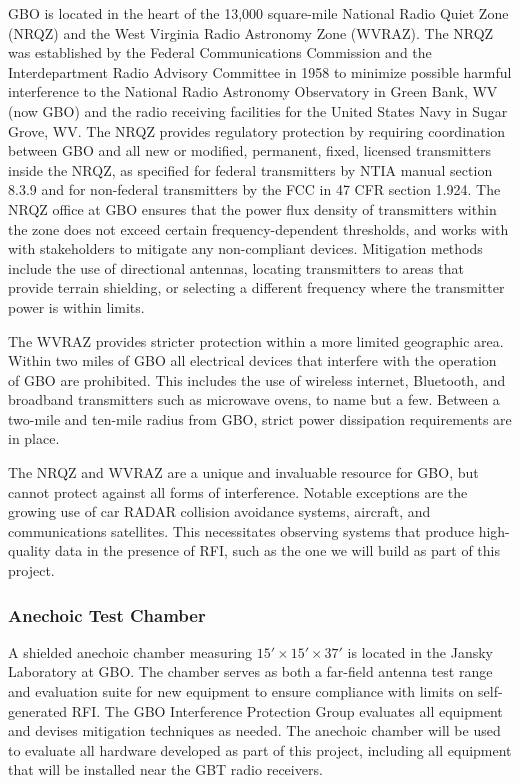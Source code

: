 \documentclass[10pt]{NSF}
\begin{document}
GBO is located in the heart of the 13,000 square-mile National Radio
Quiet Zone (NRQZ) and the West Virginia Radio Astronomy Zone (WVRAZ).
The NRQZ was established by the Federal Communications Commission and
the Interdepartment Radio Advisory Committee in 1958 to minimize
possible harmful interference to the National Radio Astronomy
Observatory in Green Bank, WV (now GBO) and the radio receiving
facilities for the United States Navy in Sugar Grove, WV.  The NRQZ
provides regulatory protection by requiring coordination between GBO
and all new or modified, permanent, fixed, licensed transmitters
inside the NRQZ, as specified for federal transmitters by NTIA manual
section 8.3.9 and for non-federal transmitters by the FCC in 47 CFR
section 1.924.  The NRQZ office at GBO ensures that the power flux
density of transmitters within the zone does not exceed certain
frequency-dependent thresholds, and works with with stakeholders to
mitigate any non-compliant devices.  Mitigation methods include the
use of directional antennas, locating transmitters to areas that
provide terrain shielding, or selecting a different frequency where
the transmitter power is within limits.

The WVRAZ provides stricter protection within a more limited
geographic area.  Within two miles of GBO all electrical devices that
interfere with the operation of GBO are prohibited.  This includes the
use of wireless internet, Bluetooth, and broadband transmitters such
as microwave ovens, to name but a few.  Between a two-mile and
ten-mile radius from GBO, strict power dissipation requirements are in
place.

The NRQZ and WVRAZ are a unique and invaluable resource for GBO, but
cannot protect against all forms of interference.  Notable exceptions
are the growing use of car RADAR collision avoidance systems,
aircraft, and communications satellites.  This necessitates observing
systems that produce high-quality data in the presence of RFI, such as
the one we will build as part of this project.

\subsubsection{Anechoic Test Chamber}

A shielded anechoic chamber measuring $15' \times 15' \times 37'$ is
located in the Jansky Laboratory at GBO.  The chamber serves as both a
far-field antenna test range and evaluation suite for new equipment to
ensure compliance with limits on self-generated RFI.  The GBO
Interference Protection Group evaluates all equipment and devises
mitigation techniques as needed.  The anechoic chamber will be used to
evaluate all hardware developed as part of this project, including all
equipment that will be installed near the GBT radio receivers.
\end{document}
